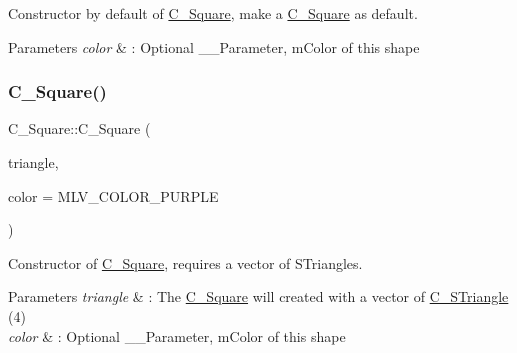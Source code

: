 Constructor by default of \hyperlink{classC__Square}{C\+\_\+\+Square}, make a \hyperlink{classC__Square}{C\+\_\+\+Square} as default. 


\begin{DoxyParams}{Parameters}
{\em color} & \+: Optional \+\_\+\+\_\+\+Parameter, m\+Color of this shape \\
\hline
\end{DoxyParams}
\mbox{\label{classC__Square_a6e100fed46e6b54971674c60a5f1d87b}} 
\subsubsection{\texorpdfstring{C\+\_\+\+Square()}{C\_Square()}\hspace{0.1cm}{\footnotesize\ttfamily [2/6]}}
{\footnotesize\ttfamily C\+\_\+\+Square\+::\+C\+\_\+\+Square (\begin{DoxyParamCaption}\item[{const std\+::vector$<$ \hyperlink{classC__STriangle}{C\+\_\+\+S\+Triangle} $>$ \&}]{triangle,  }\item[{M\+L\+V\+\_\+\+Color}]{color = {\ttfamily MLV\+\_\+COLOR\+\_\+PURPLE} }\end{DoxyParamCaption})\hspace{0.3cm}{\ttfamily [explicit]}}



Constructor of \hyperlink{classC__Square}{C\+\_\+\+Square}, requires a vector of S\+Triangles. 


\begin{DoxyParams}{Parameters}
{\em triangle} & \+: The \hyperlink{classC__Square}{C\+\_\+\+Square} will created with a vector of \hyperlink{classC__STriangle}{C\+\_\+\+S\+Triangle} (4) \\
\hline
{\em color} & \+: Optional \+\_\+\+\_\+\+Parameter, m\+Color of this shape \\
\hline
\end{DoxyParams}
\mbox{\label{classC__Square_ac1c9c3504fff971ec8cdbec9f97b020b}} 
